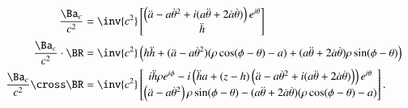 {\begin{equation}
\begin{aligned}
\frac{\Ba_c}{c^2} &=
\inv{c^2}
\begin{bmatrix}
\left( \ddot{a} - a {\dot{\theta}}^2 + i ( a\ddot{\theta} + 2 \dot{a} \dot{\theta} ) \right) e^{i\theta} \\
\ddot{h}
\end{bmatrix} \\
\frac{\Ba_c}{c^2} \cdot \BR &=
\inv{c^2} \left(
h \ddot{h} +
( \ddot{a} - a {\dot{\theta}}^2 ) (\rho \cos(\phi - \theta) - a)
+ (a \ddot{\theta} + 2 \dot{a} \dot{\theta}) \rho \sin(\phi - \theta) \right) \\
\frac{\Ba_c}{c^2} \cross \BR
&=
\inv{c^2}
\begin{bmatrix}
i \ddot{h} \rho e^{i\phi}
- i \left( \ddot{h} a + (z - h) \left( \ddot{a} - a {\dot{\theta}}^2 + i ( a\ddot{\theta} + 2 \dot{a} \dot{\theta} ) \right) \right) e^{i\theta} \\
\left( \ddot{a} - a {\dot{\theta}}^2 \right) \rho \sin(\phi - \theta)
-( a\ddot{\theta} + 2 \dot{a} \dot{\theta} ) (\rho \cos(\phi -\theta) - a)
\end{bmatrix}.
\end{aligned}
\end{equation}

}
